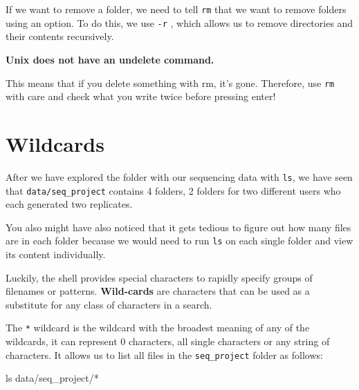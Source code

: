 \documentclass[
  letterpaper,
  DIV=11,
  numbers=noendperiod]{scrreprt}
\newenvironment{Shaded}{}{}
\newcommand{\FunctionTok}[1]{\textcolor[rgb]{0.44,0.26,0.76}{#1}}
\newcommand{\NormalTok}[1]{\textcolor[rgb]{0.14,0.16,0.18}{#1}}
\newcommand{\PreprocessorTok}[1]{\textcolor[rgb]{0.84,0.23,0.29}{#1}}
\begin{document}
If we want to remove a folder, we need to tell \texttt{rm} that we want
to remove folders using an option. To do this, we use \texttt{-r} ,
which allows us to remove directories and their contents recursively.

\begin{tcolorbox}[enhanced jigsaw, colframe=quarto-callout-important-color-frame, colbacktitle=quarto-callout-important-color!10!white, opacitybacktitle=0.6, breakable, titlerule=0mm, colback=white, toptitle=1mm, leftrule=.75mm, opacityback=0, coltitle=black, left=2mm, toprule=.15mm, bottomtitle=1mm, rightrule=.15mm, title=\textcolor{quarto-callout-important-color}{\faExclamation}\hspace{0.5em}{Important}, bottomrule=.15mm, arc=.35mm]

\textbf{Unix does not have an undelete command.}

This means that if you delete something with rm, it's gone. Therefore,
use \texttt{rm} with care and check what you write twice before pressing
enter!

\end{tcolorbox}

\section{Wildcards}\label{wildcards}

After we have explored the folder with our sequencing data with
\texttt{ls}, we have seen that \texttt{data/seq\_project} contains 4
folders, 2 folders for two different users who each generated two
replicates.

You also might have also noticed that it gets tedious to figure out how
many files are in each folder because we would need to run \texttt{ls}
on each single folder and view its content individually.

Luckily, the shell provides special characters to rapidly specify groups
of filenames or patterns. \textbf{Wild-cards} are characters that can be
used as a substitute for any class of characters in a search.

The \texttt{*} wildcard is the wildcard with the broadest meaning of any
of the wildcards, it can represent 0 characters, all single characters
or any string of characters. It allows us to list all files in the
\texttt{seq\_project} folder as follows:

\begin{Shaded}
\begin{Highlighting}[]
\FunctionTok{ls}\NormalTok{ data/seq\_project/}\PreprocessorTok{*}
\end{Highlighting}
\end{Shaded}
\end{document}
